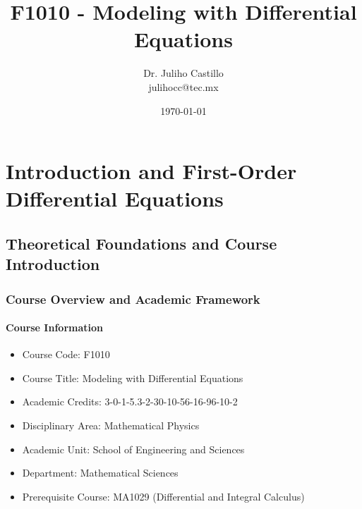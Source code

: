 \documentclass[12pt, letterpaper]{book}
\title{F1010 - Modeling with Differential Equations}
\author{Dr. Juliho Castillo\\julihocc@tec.mx}
\date{\today} %
\theoremstyle{problemstyle}
\theoremstyle{solutionstyle}
\begin{document}
\frontmatter %
\maketitle

\tableofcontents

\mainmatter %

\part{Introduction and First-Order Differential Equations}
\label{part:intro_and_first_order_de}

\chapter{Theoretical Foundations and Course Introduction}
\label{chap:introduction}

\section{Course Overview and Academic Framework}

\subsection{Course Information}
\begin{itemize}
    \item Course Code: F1010
    \item Course Title: Modeling with Differential Equations
    \item Academic Credits: 3-0-1-5.3-2-30-10-56-16-96-10-2
    \item Disciplinary Area: Mathematical Physics
    \item Academic Unit: School of Engineering and Sciences
    \item Department: Mathematical Sciences
    \item Prerequisite Course: MA1029 (Differential and Integral Calculus)
\end{itemize}
\end{document}
